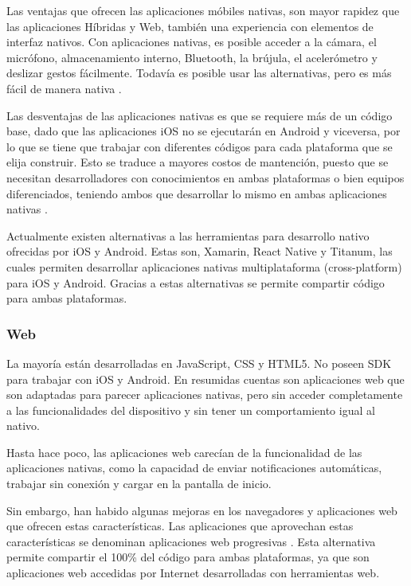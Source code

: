 	Las ventajas que ofrecen las aplicaciones móbiles nativas, son mayor rapidez que las aplicaciones Híbridas y Web, también una experiencia con elementos de interfaz nativos. Con aplicaciones nativas, es posible acceder a la cámara, el micrófono, almacenamiento interno, Bluetooth, la brújula, el acelerómetro y deslizar gestos fácilmente. Todavía es posible usar las alternativas, pero es más fácil de manera nativa \citep{mobile-apps-types}.
	
	Las desventajas de las aplicaciones nativas es que se requiere más de un código base, dado que las aplicaciones iOS no se ejecutarán en Android y viceversa, por lo que se tiene que trabajar con diferentes códigos para cada plataforma que se elija construir. Esto se traduce a mayores costos de mantención, puesto que se  necesitan desarrolladores con conocimientos en ambas plataformas o bien equipos diferenciados, teniendo ambos que desarrollar lo mismo en ambas aplicaciones nativas \citep{mobile-apps-types}.

Actualmente existen alternativas a las herramientas para desarrollo nativo ofrecidas por iOS y Android. Estas son, Xamarin, React Native y Titanum, las cuales permiten desarrollar aplicaciones nativas multiplataforma (cross-platform) para iOS y Android. Gracias a estas alternativas se permite compartir código para ambas plataformas. 
	
	\subsubsection{Web}
	La mayoría están desarrolladas en JavaScript, CSS y HTML5. No poseen SDK para trabajar con iOS y Android. En resumidas cuentas son aplicaciones web que son adaptadas para parecer aplicaciones nativas, pero sin acceder completamente a las funcionalidades del dispositivo y sin tener un comportamiento igual al nativo. 
	
	Hasta hace poco, las aplicaciones web carecían de la funcionalidad de las aplicaciones nativas, como la capacidad de enviar notificaciones automáticas, trabajar sin conexión y cargar en la pantalla de inicio.

Sin embargo, han habido algunas mejoras en los navegadores y aplicaciones web que ofrecen estas características. Las aplicaciones que aprovechan estas características se denominan aplicaciones web progresivas \citep{mobile-apps-types}. Esta alternativa permite compartir el 100\% del código para ambas plataformas, ya que son aplicaciones web accedidas por Internet desarrolladas con herramientas web.
	
